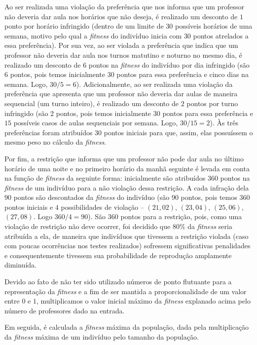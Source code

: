 \documentclass[12pt]{article}
\begin{document}
Ao ser realizada uma violação da preferência que nos informa que um professor não deveria dar aula nos horários que não deseja, é realizado um desconto de $1$ ponto por horário infringido (dentro de um limite de $30$ possíveis horários de uma semana, motivo pelo qual a \textit{fitness} do indivíduo inicia com $30$ pontos atrelados a essa preferência). Por sua vez, ao ser violada a preferência que indica que um professor não deveria dar aula nos turnos matutino e noturno no mesmo dia, é realizado um desconto de 6 pontos na \textit{fitness} do indivíduo por dia infringido (são $6$ pontos, pois temos inicialmente $30$ pontos para essa preferência e cinco dias na semana. Logo, $30 / 5 = 6$). Adicionalmente, ao ser realizada uma violação da preferência que apresenta que um professor não deveria dar aulas de maneira sequencial (um turno inteiro), é realizado um desconto de $2$ pontos por turno infringido (são 2 pontos, pois temos inicialmente $30$ pontos para essa preferência e $15$ possíveis casos de aulas sequenciais por semana. Logo, $30 / 15 = 2$). Às três preferências foram atribuídos $30$ pontos iniciais para que, assim, elas possuíssem o mesmo peso no cálculo da \textit{fitness}.

Por fim, a restrição que informa que um professor não pode dar aula no último horário de uma noite e no primeiro horário da manhã seguinte é levada em conta na função de \textit{fitness} da seguinte forma: inicialmente são atribuídos  $360$ pontos na \textit{fitness} de um indivíduo para a não violação dessa restrição. A cada infração dela $90$ pontos são descontados da \textit{fitness} do indivíduo (são $90$ pontos, pois temos $360$ pontos iniciais e $4$ possibilidades de violação -- $(21,02)$, $(23,04)$, $(25,06)$, $(27,08)$. Logo $360 / 4 = 90 $). São $360$ pontos para a restrição, pois, como uma violação de restrição não deve ocorrer, foi decidido que $80\%$ da \textit{fitness} seria atribuída a ela, de maneira que indivíduos que tivessem a restrição violada (caso com poucas ocorrências nos testes realizados) sofressem significativas penalidades e consequentemente tivessem sua probabilidade de reprodução amplamente diminuída.

Devido ao fato de não ter sido utilizado números de ponto flutuante para a representação da \textit{fitness} e a fim de ser mantida a proporcionalidade de um valor entre $0$ e $1$, multiplicamos o valor inicial máximo da \textit{fitness} explanado acima pelo número de professores dado na entrada.

Em seguida, é calculada a \textit{fitness} máxima da população, dada pela multiplicação da \textit{fitness} máxima de um indivíduo pelo tamanho da população.
\end{document}
